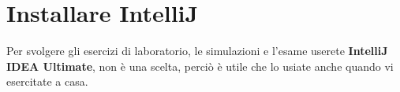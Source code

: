 \section{Installare IntelliJ}
    Per svolgere gli esercizi di laboratorio, le simulazioni e l'esame userete \textbf{IntelliJ IDEA Ultimate}, non è una scelta, perciò è utile che lo usiate anche 
    quando vi esercitate a casa.